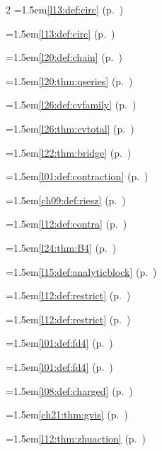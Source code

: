 \begin{multicols}{2}
\hangindent=1.5em\quad \ref{l13:def:circ} (p.~\pageref{l13:def:circ})\par
\hangindent=1.5em\quad \ref{l13:def:circ} (p.~\pageref{l13:def:circ})\par
\hangindent=1.5em\quad \ref{l20:def:chain} (p.~\pageref{l20:def:chain})\par
\hangindent=1.5em\quad \ref{l20:thm:qseries} (p.~\pageref{l20:thm:qseries})\par
\hangindent=1.5em\quad \ref{l26:def:cvfamily} (p.~\pageref{l26:def:cvfamily})\par
\hangindent=1.5em\quad \ref{l26:thm:cvtotal} (p.~\pageref{l26:thm:cvtotal})\par
\hangindent=1.5em\quad \ref{l22:thm:bridge} (p.~\pageref{l22:thm:bridge})\par
\hangindent=1.5em\quad \ref{l01:def:contraction} (p.~\pageref{l01:def:contraction})\par
\hangindent=1.5em\quad \ref{ch09:def:riesz} (p.~\pageref{ch09:def:riesz})\par
\hangindent=1.5em\quad \ref{l12:def:contra} (p.~\pageref{l12:def:contra})\par
\hangindent=1.5em\quad \ref{l24:thm:B4} (p.~\pageref{l24:thm:B4})\par
\hangindent=1.5em\quad \ref{l15:def:analyticblock} (p.~\pageref{l15:def:analyticblock})\par
\hangindent=1.5em\quad \ref{l12:def:restrict} (p.~\pageref{l12:def:restrict})\par
\hangindent=1.5em\quad \ref{l12:def:restrict} (p.~\pageref{l12:def:restrict})\par
\hangindent=1.5em\quad \ref{l01:def:fd4} (p.~\pageref{l01:def:fd4})\par
\hangindent=1.5em\quad \ref{l01:def:fd4} (p.~\pageref{l01:def:fd4})\par
\hangindent=1.5em\quad \ref{l08:def:charged} (p.~\pageref{l08:def:charged})\par
\hangindent=1.5em\quad \ref{ch21:thm:gvis} (p.~\pageref{ch21:thm:gvis})\par
\hangindent=1.5em\quad \ref{l12:thm:zhuaction} (p.~\pageref{l12:thm:zhuaction})\par

\end{multicols}
